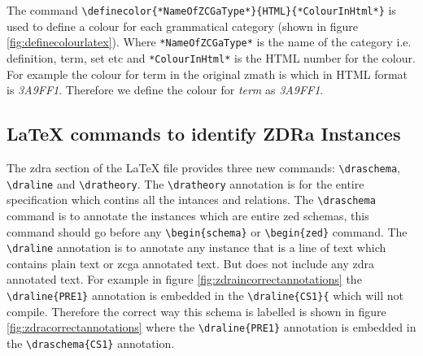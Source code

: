 The command \verb|\definecolor{*NameOfZCGaType*}{HTML}{*ColourInHtml*}| is used to define a colour for each grammatical category (shown in figure \ref{fig:definecolourlatex}). Where \verb|*NameOfZCGaType*| is the name of the category i.e. definition, term, set etc and \verb|*ColourInHtml*| is the HTML number for the colour. For example the colour for term in the original \gls{zmath} is  which in HTML format is \emph{3A9FF1}. Therefore we define the colour for \emph{term} as \emph{3A9FF1}.

\subsection{\LaTeX{} commands to identify ZDRa Instances}

The \gls{zdra} section of the \LaTeX{} file provides three new commands: \verb|\draschema|, \verb|\draline| and \verb|\dratheory|. The \verb|\dratheory| annotation is for the entire specification which contins all the intances and relations. The \verb|\draschema| command is to annotate the instances which are entire zed schemas, this command should go before any \verb|\begin{schema}| or \verb|\begin{zed}| command. The \verb|\draline| annotation is to annotate any instance that is a line of text which contains plain text or \gls{zcga} annotated text. But does not include any \gls{zdra} annotated text. For example in figure \ref{fig:zdraincorrectannotations} the \verb|\draline{PRE1}| annotation is embedded in the \verb|\draline{CS1}{| which will not compile. Therefore the correct way this schema is labelled is shown in figure \ref{fig:zdracorrectannotations} where the \verb|\draline{PRE1}| annotation is embedded in the \verb|\draschema{CS1}| annotation.

